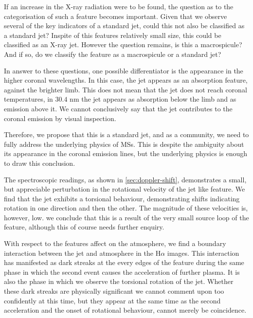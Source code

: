 If an increase in the X-ray radiation were to be found, the question as to the categorisation of such a feature becomes important.
Given that we observe several of the key indicators of a standard jet, could this not also be classified as a standard jet? 
Inspite of this features relatively small size, this could be classified as an X-ray jet.
However the question remains, is this a macrospicule?
And if so, do we classify the feature as a macrospicule or a standard jet?

In answer to these questions, one possible differentiator is the appearance in the higher coronal wavelengths.
In this case, the jet appears as an absorption feature, against the brighter limb.
This does not mean that the jet does not reach coronal temperatures, in $30.4$ nm the jet appears as absorption below the limb and as emission above it.
We cannot conclusively say that the jet contributes to the coronal emission by visual inspection.

Therefore, we propose that this is a standard jet, and as a community, we need to fully address the underlying physics of MSs.
This is despite the ambiguity about its appearance in the coronal emission lines, but the underlying physics is enough to draw this conclusion.

The spectroscopic readings, as shown in \cref{sec:doppler-shift}, demonstrates a small, but appreciable perturbation in the rotational velocity of the jet like feature.
We find that the jet exhibits a torsional behaviour, demonstrating shifts indicating rotation in one direction and then the other.
The magnitude of these velocities is, however, low.
we conclude that this is a result of the very small source loop of the feature, although this of course needs further enquiry. 

With respect to the features affect on the atmosphere, we find a boundary interaction between the jet and atmosphere in the H$\alpha$ images.
This interaction has manifested as dark streaks at the every edges of the feature during the same phase in which the second event causes the acceleration of further plasma.
It is also the phase in which we observe the torsional rotation of the jet.
Whether these dark streaks are physically significant we cannot comment upon too confidently at this time, but they appear at the same time as the second acceleration and the onset of rotational behaviour, cannot merely be coincidence.
